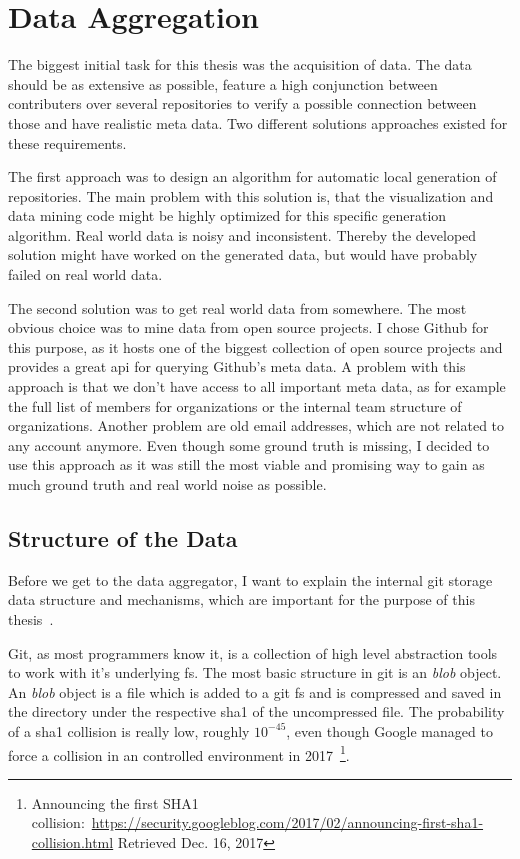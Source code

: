 \chapter{Data Aggregation}

The biggest initial task for this thesis was the acquisition of data.
The data should be as extensive as possible, feature a high conjunction between contributers over several repositories to verify a possible connection between those and have realistic meta data.
Two different solutions approaches existed for these requirements.

The first approach was to design an algorithm for automatic local generation of repositories.
The main problem with this solution is, that the visualization and data mining code might be highly optimized for this specific generation algorithm.
Real world data is noisy and inconsistent. Thereby the developed solution might have worked on the generated data, but would have probably failed on real world data.

The second solution was to get real world data from somewhere. The most obvious choice was to mine data from open source projects.
I chose Github for this purpose, as it hosts one of the biggest collection of open source projects and provides a great \ac{api} for querying Github's meta data.
A problem with this approach is that we don't have access to all important meta data, as for example the full list of members for organizations or the internal team structure of organizations.
Another problem are old email addresses, which are not related to any account anymore.
Even though some ground truth is missing, I decided to use this approach as it was still the most viable and promising way to gain as much ground truth and real world noise as possible.


\section{Structure of the Data}

Before we get to the data aggregator, I want to explain the internal git storage data structure and mechanisms, which are important for the purpose of this thesis~\cite{book:pro-git}.

Git, as most programmers know it, is a collection of high level abstraction tools to work with it's underlying \ac{fs}.
The most basic structure in git is an \emph{blob} object.
An \emph{blob} object is a file which is added to a git \ac{fs} and is compressed and saved in the  directory under the respective \ac{sha1} of the uncompressed file.
The probability of a \ac{sha1} collision is really low, roughly $10^{-45}$, even though Google managed to force a collision in an controlled environment in 2017~\footnote{Announcing the first SHA1 collision:~\url{https://security.googleblog.com/2017/02/announcing-first-sha1-collision.html} Retrieved Dec. 16, 2017}.

